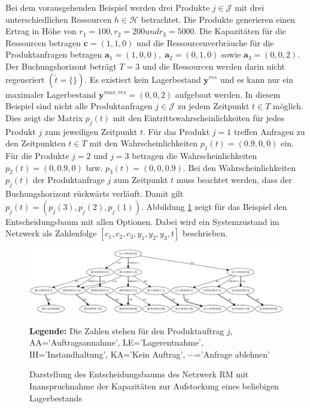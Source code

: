 Bei dem vorausgehenden Beispiel werden drei Produkte $j\in\mathcal{J}$ mit drei unterschiedlichen Ressourcen $h\in\mathcal{H}$ betrachtet. Die Produkte generieren einen Ertrag in Höhe von $r_1=100, r_2=200 und r_3=5000$. Die Kapazitäten für die Ressourcen betragen $\textbf{c}=(1,1,0)$ und die Ressourcenverbräuche für die Produktanfragen betragen $\textbf{a}_1=(1,0,0),\; \textbf{a}_2=(0,1,0)$ sowie $\textbf{a}_3=(0,0,2)$. Der Buchungshorizont beträgt $T=3$ und die Ressourcen werden darin nicht regeneriert $(\tilde{t}=\{\})$. Es existiert kein Lagerbestand $\textbf{y}^{res}$ und es kann nur ein maximaler Lagerbestand $\textbf{y}^{max,res}=(0, 0, 2)$ aufgebaut werden. In diesem Beispiel sind nicht alle Produktanfragen $j\in\mathcal{J}$ zu jedem Zeitpunkt $t\in T$ möglich. Dies zeigt die Matrix $p_{j}(t)$ mit den Eintrittswahrscheinlichkeiten für jedes Produkt $j$ zum jeweiligen Zeitpunkt $t$. Für das Produkt $j=1$ treffen Anfragen zu den Zeitpunkten $t\in T$ mit den Wahrscheinlichkeiten $p_{1}(t)=(0.9, 0, 0)$ ein. Für die Produkte $j=2$ und $j=3$ betragen die Wahrscheinlichkeiten $p_{2}(t)=(0, 0.9, 0)$ bzw. $p_{3}(t)=(0, 0, 0.9)$. Bei den Wahrscheinlichkeiten $p_j(t)$ der Produktanfrage $j$ zum Zeitpunkt $t$ muss beachtet werden, dass der Buchungshorizont rückwärts verläuft. Damit gilt $p_{j}(t)=(p_{j}(3), p_{j}(2), p_{j}(1))$. Abbildung \ref{B7} zeigt für das Beispiel den Entscheidungsbaum mit allen Optionen. Dabei wird ein Systemzustand im Netzwerk als Zahlenfolge $[c_1,c_2,c_3,y_1,y_2,y_3,t]$ beschrieben.
 
\begin{figure}[h!]
  \begin{center}
    \includegraphics[width=200mm, angle=90]{Bilder/Beispiel7.pdf}
    \caption{Darstellung des Entscheidungsbaums des Netzwerk RM mit Inanspruchnahme der Kapazitäten zur Aufstockung eines beliebigen Lagerbestands}  \label{B7}
    {\footnotesize \textbf{Legende:} Die Zahlen stehen für den Produktauftrag $j$, AA='Auftragsannahme', LE='Lagerentnahme', IH='Instandhaltung', KA='Kein Auftrag', $\cdots$='Anfrage ablehnen'} 
  \end{center}
\end{figure}

